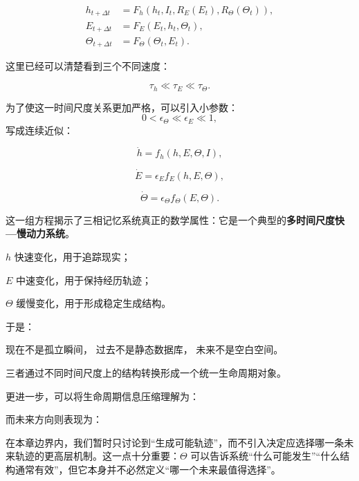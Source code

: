 \begin{equation}
\boxed{
\begin{aligned}
h_{t+\Delta t}
&=
F_h
(
h_t,
I_t,
R_E(E_t),
R_\Theta(\Theta_t)
),\\
E_{t+\Delta t}
&=
F_E
(
E_t,
h_t,
\Theta_t
),\\
\Theta_{t+\Delta t}
&=
F_\Theta
(
\Theta_t,
E_t
).
\end{aligned}
}
\end{equation}

这里已经可以清楚看到三个不同速度：

\[
\tau_h
\ll
\tau_E
\ll
\tau_\Theta.
\]

为了使这一时间尺度关系更加严格，可以引入小参数：
\[
0<\epsilon_\Theta\ll\epsilon_E\ll1,
\]
写成连续近似：

\[
\dot h
=
f_h(h,E,\Theta,I),
\]

\[
\dot E
=
\epsilon_E
f_E(h,E,\Theta),
\]

\[
\dot\Theta
=
\epsilon_\Theta
f_\Theta(E,\Theta).
\]

这一组方程揭示了三相记忆系统真正的数学属性：它是一个典型的\textbf{多时间尺度快—慢动力系统}。

\(h\) 快速变化，用于追踪现实；

\(E\) 中速变化，用于保持经历轨迹；

\(\Theta\) 缓慢变化，用于形成稳定生成结构。

于是：
\begin{statementbox}
现在不是孤立瞬间，
过去不是静态数据库，
未来不是空白空间。
\end{statementbox}

三者通过不同时间尺度上的结构转换形成一个统一生命周期对象。

更进一步，可以将生命周期信息压缩理解为：

\begin{statementbox}
\centering
{}
\end{statementbox}

而未来方向则表现为：

\begin{statementbox}
\centering
{}
\end{statementbox}

在本章边界内，我们暂时只讨论到“生成可能轨迹”，而不引入决定应选择哪一条未来轨迹的更高层机制。这一点十分重要：\(\Theta\) 可以告诉系统“什么可能发生”“什么结构通常有效”，但它本身并不必然定义“哪一个未来最值得选择”。

